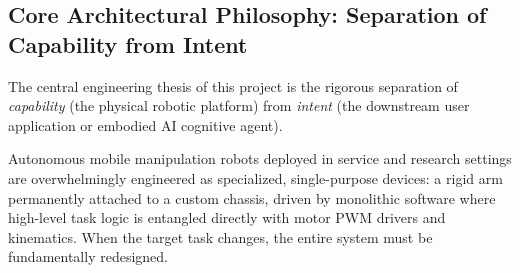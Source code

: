 \subsection{Core Architectural Philosophy: Separation of Capability from Intent}
The central engineering thesis of this project is the rigorous separation of \emph{capability} (the physical robotic platform) from \emph{intent} (the downstream user application or embodied AI cognitive agent).

Autonomous mobile manipulation robots deployed in service and research settings are overwhelmingly engineered as specialized, single-purpose devices: a rigid arm permanently attached to a custom chassis, driven by monolithic software where high-level task logic is entangled directly with motor PWM drivers and kinematics. When the target task changes, the entire system must be fundamentally redesigned.

